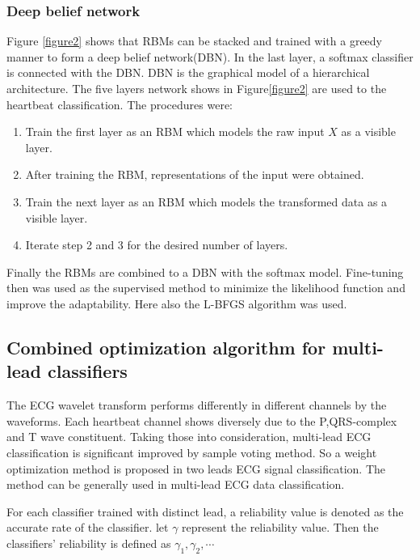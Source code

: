 \documentclass[conference]{IEEEtran}
\begin{document}
\subsubsection{Deep belief network}

Figure \ref{figure2} shows that RBMs can be stacked and trained with a greedy manner to form a deep belief network(DBN)\cite{Juergen, Bengio2009}. In the last layer, a softmax classifier is connected with the DBN. DBN is the graphical model of a hierarchical architecture. The five layers network shows in Figure\ref{figure2} are used to the heartbeat classification. The procedures were:
\begin{enumerate}
\item Train the first layer as an RBM which models the raw input $X$ as a visible layer.
\item After training the RBM, representations of the input were obtained.
\item Train the next layer as an RBM which models the transformed data as a visible layer.
\item Iterate step 2 and 3 for the desired number of layers.
\end{enumerate}

Finally the RBMs are combined to a DBN with the softmax model. Fine-tuning then was used as the supervised method to minimize the likelihood function and improve the adaptability. Here also the L-BFGS algorithm was used.

\subsection{Combined optimization algorithm for multi-lead classifiers}

The ECG wavelet transform performs differently in different channels by the waveforms. Each heartbeat channel shows diversely due to the P,QRS-complex and T wave constituent. 
Taking those into consideration, multi-lead ECG classification is significant improved by sample voting method. So a weight optimization method is proposed in two leads ECG signal classification. 
The method can be generally used in multi-lead ECG data classification. 

For each classifier trained with distinct lead, a reliability value is denoted as the accurate rate of the classifier. let $\gamma$ represent the reliability value. Then the classifiers' reliability is defined as $\gamma_1, \gamma_2, \cdots$
\end{document}
